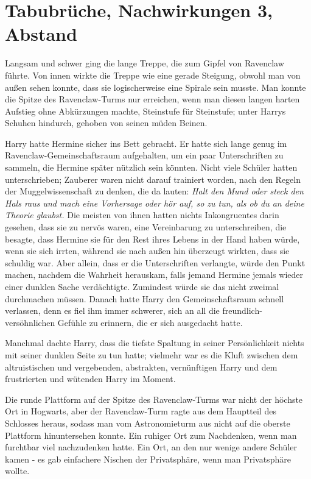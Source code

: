 \chapter{Tabubrüche, Nachwirkungen 3, Abstand}

Langsam und schwer ging die lange Treppe, die zum Gipfel von Ravenclaw führte.
Von innen wirkte die Treppe wie eine gerade Steigung, obwohl man von außen sehen
konnte, dass sie logischerweise eine Spirale sein musste. Man konnte die Spitze
des Ravenclaw-Turms nur erreichen, wenn man diesen langen harten Aufstieg ohne
Abkürzungen machte, Steinstufe für Steinstufe; unter Harrys Schuhen hindurch,
gehoben von seinen müden Beinen.

Harry hatte Hermine sicher ins Bett gebracht. Er hatte sich lange genug im
Ravenclaw-Gemeinschaftsraum aufgehalten, um ein paar Unterschriften zu sammeln,
die Hermine später nützlich sein könnten. Nicht viele Schüler hatten
unterschrieben; Zauberer waren nicht darauf trainiert worden, nach den Regeln
der Muggelwissenschaft zu denken, die da lauten: \emph{Halt den Mund oder steck
den Hals raus und mach eine Vorhersage oder hör auf, so zu tun, als ob du an
deine Theorie glaubst.} Die meisten von ihnen hatten nichts Inkongruentes darin
gesehen, dass sie zu nervös waren, eine Vereinbarung zu unterschreiben, die
besagte, dass Hermine sie für den Rest ihres Lebens in der Hand haben würde,
wenn sie sich irrten, während sie nach außen hin überzeugt wirkten, dass sie
schuldig war. Aber allein, dass er die Unterschriften verlangte, würde den Punkt
machen, nachdem die Wahrheit herauskam, falls jemand Hermine jemals wieder einer
dunklen Sache verdächtigte. Zumindest würde sie das nicht zweimal durchmachen
müssen. Danach hatte Harry den Gemeinschaftsraum schnell verlassen, denn es fiel
ihm immer schwerer, sich an all die freundlich-versöhnlichen Gefühle zu
erinnern, die er sich ausgedacht hatte.

Manchmal dachte Harry, dass die tiefste Spaltung in seiner Persönlichkeit nichts
mit seiner dunklen Seite zu tun hatte; vielmehr war es die Kluft zwischen dem
altruistischen und vergebenden, abstrakten, vernünftigen Harry und dem
frustrierten und wütenden Harry im Moment.

Die runde Plattform auf der Spitze des Ravenclaw-Turms war nicht der höchste Ort
in Hogwarts, aber der Ravenclaw-Turm ragte aus dem Hauptteil des Schlosses
heraus, sodass man vom Astronomieturm aus nicht auf die oberste Plattform
hinuntersehen konnte. Ein ruhiger Ort zum Nachdenken, wenn man furchtbar viel
nachzudenken hatte. Ein Ort, an den nur wenige andere Schüler kamen - es gab
einfachere Nischen der Privatsphäre, wenn man Privatsphäre wollte.

